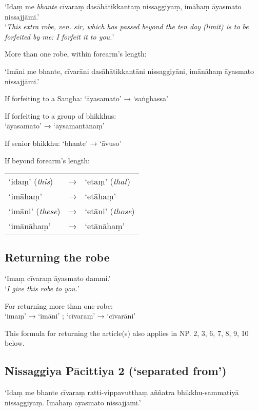 ‘Idaṃ me \emph{bhante} cīvaraṃ dasāhātikkantaṃ nissaggiyaṃ, imāhaṃ āyasmato nissajjāmi.’\\
‘\emph{This extra robe, ven. sir, which has passed beyond the ten day (limit) is
  to be forfeited by me: I forfeit it to you.}’

More than one robe, within forearm's length:

‘Imāni me bhante, cīvarāni dasāhātikkantāni nissaggiyāni, imānāhaṃ āyasmato nissajjāmi.’

If forfeiting to a Sangha: ‘āyasamato’ → ‘saṅghassa’ 

If forfeiting to a group of bhikkhus:\\
‘āyasamato’ → ‘āysamantānaṃ’

If senior bhikkhu: ‘bhante’ → ‘āvuso’

If beyond forearm's length:

\begin{tabular}{@{}lll@{}}
‘idaṃ’ (\emph{this}) & → & ‘etaṃ’ (\emph{that}) \\
‘imāhaṃ’             & → & ‘etāhaṃ’             \\
‘imāni’ (\emph{these}) & → & ‘etāni’ (\emph{those})\\
‘imānāhaṃ’             & → & ‘etānāhaṃ’\\
\end{tabular}


\vspace*{-\baselineskip}

\subsection{Returning the robe}
\label{np-1-returning-the-robe}

‘Imaṃ cīvaraṃ āyasmato dammi.’\\
‘\emph{I give this robe to you.}’ 

For returning more than one robe:\\
‘imaṃ’ → ‘imāni’ ; ‘cīvaraṃ’ → ‘cīvarāni’

This formula for returning the article(s) also applies in NP. 2, 3, 6, 7, 8, 9,
10 below.

\subsection{Nissaggiya Pācittiya 2 (‘separated from’)}

‘Idaṃ me bhante cīvaraṃ ratti-vippavutthaṃ aññatra bhikkhu-sammatiyā
nissaggiyaṃ. Imāhaṃ āyasmato nissajjāmi.’

